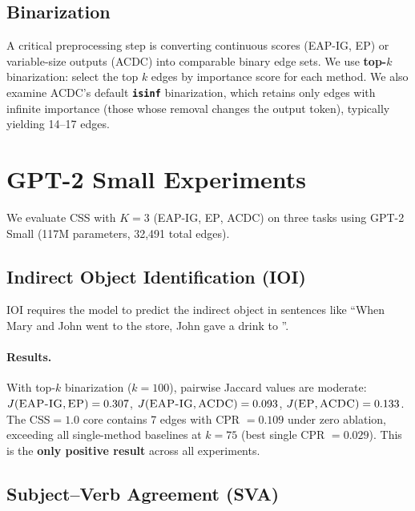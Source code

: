 \documentclass[11pt,a4paper]{article}
\newcommand{\css}{\textsc{CSS}}
\newcommand{\eapig}{\textsc{EAP-IG}}
\newcommand{\ep}{\textsc{EP}}
\newcommand{\acdc}{\textsc{ACDC}}
\begin{document}
\subsection{Binarization}
\label{sec:binarization_method}

A critical preprocessing step is converting continuous scores (\eapig{}, \ep{}) or variable-size outputs (\acdc{}) into comparable binary edge sets.
We use \textbf{top-$k$} binarization: select the top $k$ edges by importance score for each method.
We also examine \acdc{}'s default \textbf{\texttt{isinf}} binarization, which retains only edges with infinite importance (those whose removal changes the output token), typically yielding 14--17 edges.

\section{GPT-2 Small Experiments}
\label{sec:gpt2}

We evaluate \css{} with $K = 3$ (\eapig{}, \ep{}, \acdc{}) on three tasks using GPT-2 Small (117M parameters, 32,491 total edges).

\subsection{Indirect Object Identification (IOI)}

IOI requires the model to predict the indirect object in sentences like ``When Mary and John went to the store, John gave a drink to \underline{\hspace{1cm}}''.

\paragraph{Results.} With top-$k$ binarization ($k = 100$), pairwise Jaccard values are moderate: $J(\text{\eapig{}}, \text{\ep{}}) = 0.307$, $J(\text{\eapig{}}, \text{\acdc{}}) = 0.093$, $J(\text{\ep{}}, \text{\acdc{}}) = 0.133$.
The \css{}$= 1.0$ core contains 7 edges with CPR $= 0.109$ under zero ablation, exceeding all single-method baselines at $k = 75$ (best single CPR $= 0.029$).
This is the \textbf{only positive result} across all experiments.

\subsection{Subject--Verb Agreement (SVA)}
\end{document}
